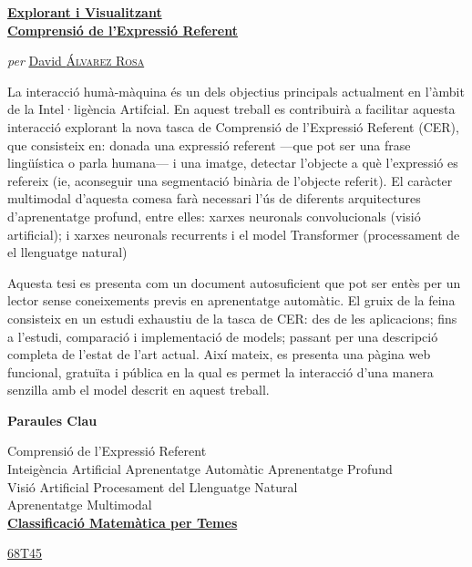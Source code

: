 \clearpage
\thispagestyle{plain}
\null\vfill

\begin{otherlanguage}{catalan}
  \begin{center}
    \Large
    \href{https://recomprehension.com/}{\textbf{Explorant i Visualitzant\\
        Comprensió de l'Expressió Referent}}

    \vspace{2ex} \large \textit{per}
    \href{https://david.alvarezrosa.com/}{David \textsc{Álvarez Rosa}}

    \vspace{3ex} \textbf{\abstractname}
  \end{center}

  \vspace{-2ex}
  \noindent La interacció humà-màquina és un dels objectius principals
  actualment en l'àmbit de la Intel·ligència Artifcial. En aquest treball es
  contribuirà a facilitar aquesta interacció explorant la nova tasca de
  Comprensió de l'Expressió Referent (CER), que consisteix en: donada una
  expressió referent ---que pot ser una frase lingüística o parla humana--- i
  una imatge, detectar l'objecte a què l'expressió es refereix (ie, aconseguir
  una segmentació binària de l'objecte referit). El caràcter multimodal
  d'aquesta comesa farà necessari l'ús de diferents arquitectures
  d'aprenentatge profund, entre elles: xarxes neuronals convolucionals (visió
  artificial); i xarxes neuronals recurrents i el model Transformer
  (processament de el llenguatge natural)

  Aquesta tesi es presenta com un document autosuficient que pot ser entès per
  un lector sense coneixements previs en aprenentatge automàtic. El gruix de la
  feina consisteix en un estudi exhaustiu de la tasca de CER: des de les
  aplicacions; fins a l'estudi, comparació i implementació de models; passant
  per una descripció completa de l'estat de l'art actual. Així mateix, es
  presenta una pàgina web funcional, gratuïta i pública en la qual es permet la
  interacció d'una manera senzilla amb el model descrit en aquest treball.

  \begin{center}


    \bigskip\smallskip \textbf{Paraules Clau}

    Comprensió de l'Expressió Referent\\
    Inte\lgem{}igència Artificial \textbullet{} Aprenentatge Automàtic
    \textbullet{} Aprenentatge Profund\\
    Visió Artificial \textbullet{} Procesament del Llenguatge Natural\\
    Aprenentatge Multimodal\\

    \bigskip
    \href{https://mathscinet.ams.org/msc/msc2010.html}{\textbf{Classificació
        Matemàtica per Temes}}

    \href{https://mathscinet.ams.org/msc/msc2010.html?t=68Txx}{68T45}
  \end{center}
\end{otherlanguage}
\vfill\null



